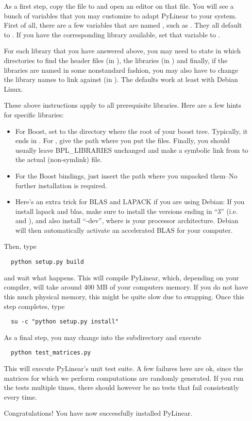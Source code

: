 As a first step, copy the file  to
 and open an editor on that file. You will
see a bunch of variables that you may customize to adapt
PyLinear to your system. First of all, there are a few variables
that are named , such as . They
all default to . If you have the corresponding library
available, set that variable to .

For each library that you have answered  above, you may
need to state in which directories to find the header files (in
), the libraries (in )
and finally, if the libraries are named in some nonstandard fashion,
you may also have to change the library names to link against (in
). The defaults work at least with Debian Linux. 

These above instructions apply to all prerequisite libraries. Here are
a few hints for specific libraries:
\begin{itemize}
\item For Boost, set  to the directory where
  the root of your boost tree.  Typically, it ends in
  . For , give the path where you
  put the  files. Finally, you should
  usually leave BPL_LIBRARIES unchanged and make a symbolic link from
   to the actual (non-symlink) 
  file.
\item For the Boost bindings, just insert the path where you unpacked
  them--No further installation is required.
\item Here's an extra trick for BLAS and LAPACK if you are using
  Debian: If you install lapack and blas, make sure to install the
  versions ending in ``3'' (i.e.  and
  ), and also install ``-dev'',
  where  is your processor architecture. Debian will then
  automatically activate an accelerated BLAS for your computer.
\end{itemize}

Then, type
\begin{verbatim}
  python setup.py build
\end{verbatim}
and wait what happens. This will compile PyLinear, which, depending on
your compiler, will take around 400 MB of your computers memory. If you
do not have this much physical memory, this might be quite slow due to
swapping. Once this step completes, type
\begin{verbatim}
  su -c "python setup.py install"
\end{verbatim}

As a final step, you may change into the  subdirectory
and execute
\begin{verbatim}
  python test_matrices.py
\end{verbatim}
This will execute PyLinear's unit test suite. A few failures here
are ok, since the matrices for which we perform computations are
randomly generated. If you run the tests multiple times, there
should however be no tests that fail consistently every time.

Congratulations! You have now successfully installed PyLinear.
